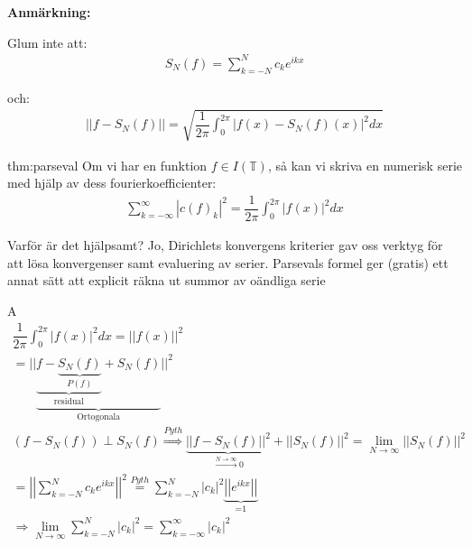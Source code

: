 \par\bigskip
\noindent\textbf{Anmärkning:}\par
\noindent Glum inte att:
\begin{equation*}
  \begin{gathered}
    S_N(f) = \sum_{k=-N}^{N}c_ke^{ikx}
  \end{gathered}
\end{equation*}\par
\noindent och:
\begin{equation*}
  \begin{gathered}
    \left|\left|f-S_N(f)\right|\right| = \sqrt{\dfrac{1}{2\pi}\int_{0}^{2\pi}\left|f(x)-S_N(f)(x)\right|^2dx}
  \end{gathered}
\end{equation*}
\par\bigskip
\begin{theo}{thm:parseval}
  Om vi har en funktion $f\in I(\mathbb{T})$, så kan vi skriva en numerisk serie med hjälp av dess fourierkoefficienter:
  \begin{equation*}
    \begin{gathered}
      \sum_{k=-\infty}^{\infty}\left|c(f)_k\right|^2 = \dfrac{1}{2\pi}\int_{0}^{2\pi}\left|f(x)\right|^2dx
    \end{gathered}
  \end{equation*}
\end{theo}
\par\bigskip
\noindent Varför är det hjälpsamt? Jo, Dirichlets konvergens kriterier gav oss verktyg för att lösa konvergenser samt evaluering av serier. Parsevals formel ger (gratis) ett annat sätt att explicit räkna ut summor av oändliga serie
\par\bigskip
\begin{prf}
  A
  \begin{equation*}
    \begin{gathered}
      \dfrac{1}{2\pi}\int_{0}^{2\pi}\left|f(x)\right|^2dx = \left|\left|f(x)\right|\right|^2\\
      = ||\underbrace{\underbrace{f-\underbrace{S_N(f)}_{\text{$P(f)$}}}_{\text{residual}}+S_N(f)}_{\text{Ortogonala}}||^2\\
      (f-S_N(f))\perp S_N(f)\stackrel{Pyth}{\Rightarrow}\underbrace{\left|\left|f-S_N(f)\right|\right|^2}_{\text{$\stackrel{N\to\infty}{\to}0$}}+\left|\left|S_N(f)\right|\right|^2 = \lim_{N\to\infty}\left|\left|S_N(f)\right|\right|^2\\
      =\left|\left|\sum_{k=-N}^{N}c_ke^{ikx}\right|\right|^2\stackrel{Pyth}{=}\sum_{k=-N}^{N}\left|c_k\right|^2\underbrace{\left|\left|e^{ikx}\right|\right|}_{\text{=1}}\\
      \Rightarrow \lim_{N\to\infty}\sum_{k=-N}^{N}\left|c_k\right|^2 = \sum_{k=-\infty}^{\infty}\left|c_k\right|^2
    \end{gathered}
  \end{equation*}
\end{prf}
